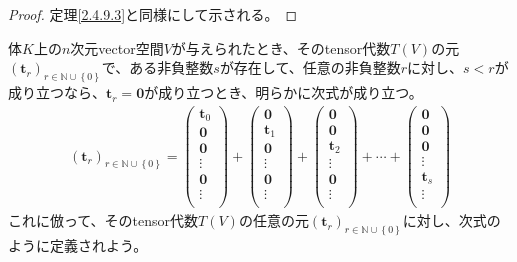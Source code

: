 \documentclass[dvipdfmx]{jsarticle}
\begin{document}
\begin{proof} 定理\ref{2.4.9.3}と同様にして示される。
\end{proof}
\begin{dfn}
体$K$上の$n$次元vector空間$V$が与えられたとき、そのtensor代数$T(V)$の元$\left( \mathbf{t}_{r} \right)_{r \in \mathbb{N} \cup \left\{ 0 \right\}}$で、ある非負整数$s$が存在して、任意の非負整数$r$に対し、$s < r$が成り立つなら、$\mathbf{t}_{r} = \mathbf{0}$が成り立つとき、明らかに次式が成り立つ。
\begin{align*}
\left( \mathbf{t}_{r} \right)_{r \in \mathbb{N} \cup \left\{ 0 \right\}} = \begin{pmatrix}
\mathbf{t}_{0} \\
\mathbf{0} \\
\mathbf{0} \\
 \vdots \\
\mathbf{0} \\
 \vdots \\
\end{pmatrix} + \begin{pmatrix}
\mathbf{0} \\
\mathbf{t}_{1} \\
\mathbf{0} \\
 \vdots \\
\mathbf{0} \\
 \vdots \\
\end{pmatrix} + \begin{pmatrix}
\mathbf{0} \\
\mathbf{0} \\
\mathbf{t}_{2} \\
 \vdots \\
\mathbf{0} \\
 \vdots \\
\end{pmatrix} + \cdots + \begin{pmatrix}
\mathbf{0} \\
\mathbf{0} \\
\mathbf{0} \\
 \vdots \\
\mathbf{t}_{s} \\
 \vdots \\
\end{pmatrix}
\end{align*}
これに倣って、そのtensor代数$T(V)$の任意の元$\left( \mathbf{t}_{r} \right)_{r \in \mathbb{N} \cup \left\{ 0 \right\}}$に対し、次式のように定義されよう。
\begin{align*}

\end{align*}
\end{dfn}
\end{document}

